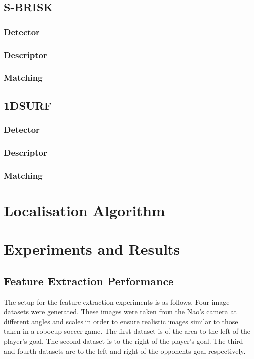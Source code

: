 \documentclass{article}
\begin{document}
\subsection{S-BRISK}
\label{sec:sbrisk}

\subsubsection{Detector}
\label{sbriskDetect}

\subsubsection{Descriptor}
\label{sbriskDescribe}

\subsubsection{Matching}
\label{sbriskMatching}

\subsection{1DSURF}
\label{sec:1dsurf}

\subsubsection{Detector}
\label{1dsurfDetect}

\subsubsection{Descriptor}
\label{1dsurfDescribe}

\subsubsection{Matching}
\label{1dsurfMatching}

\section{Localisation Algorithm}
\label{sec:localisation}

\section{Experiments and Results}
\label{sec:experimentsResults}

\subsection{Feature Extraction Performance}
\label{sec:featureExtraction}
The setup for the feature extraction experiments is as follows. Four image datasets were generated. These images were taken from the Nao's camera at different angles and scales in order to ensure realistic images similar to those taken in a robocup soccer game. The first dataset is of the area to the left of the player's goal. The second dataset is to the right of the player's goal. The third and fourth datasets are to the left and right of the opponents goal respectively.\\
\end{document}
